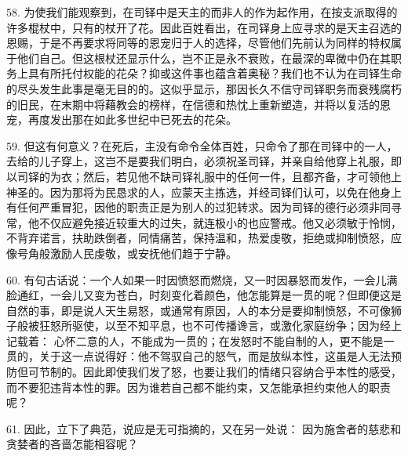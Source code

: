 58. 为使我们能观察到，在司铎中是天主的而非人的作为起作用，在按支派取得的许多棍杖中，只有的杖开了花。因此百姓看出，在司铎身上应寻求的是天主召选的恩赐，于是不再要求将同等的恩宠归于人的选择，尽管他们先前认为同样的特权属于他们自己。但这根杖还显示什么，岂不正是永不衰败，在最深的卑微中仍在其职务上具有所托付权能的花朵？抑或这件事也蕴含着奥秘？我们也不认为在司铎生命的尽头发生此事是毫无目的的。这似乎显示，那因长久不信守司铎职务而衰残腐朽的旧民，在末期中将藉教会的榜样，在信德和热忱上重新塑造，并将以复活的恩宠，再度发出那在如此多世纪中已死去的花朵。\par

59. 但这有何意义？在死后，主没有命令全体百姓，只命令了那在司铎中的一人，去给的儿子穿上，这岂不是要我们明白，必须祝圣司铎，并亲自给他穿上礼服，即以司铎的为衣；然后，若见他不缺司铎礼服中的任何一件，且都齐备，才可领他上神圣的。因为那将为民恳求的人，应蒙天主拣选，并经司铎们认可，以免在他身上有任何严重冒犯，因他的职责正是为别人的过犯转求。因为司铎的德行必须非同寻常，他不仅应避免接近较重大的过失，就连极小的也应警戒。他又必须敏于怜悯，不背弃诺言，扶助跌倒者，同情痛苦，保持温和，热爱虔敬，拒绝或抑制愤怒，应像号角般激励人民虔敬，或安抚他们趋于宁静。\par

60. 有句古话说：一个人如果一时因愤怒而燃烧，又一时因暴怒而发作，一会儿满脸通红，一会儿又变为苍白，时刻变化着颜色，他怎能算是一贯的呢？但即便这是自然的事，即是说人天生易怒，或通常有原因，人的本分是要抑制愤怒，不可像狮子般被狂怒所驱使，以至不知平息，也不可传播谗言，或激化家庭纷争；因为经上记载着： 心怀二意的人，不能成为一贯的；在发怒时不能自制的人，更不能是一贯的，关于这一点说得好：他不驾驭自己的怒气，而是放纵本性，这虽是人无法预防但可节制的。因此即使我们发了怒，也要让我们的情绪只容纳合乎本性的感受，而不要犯违背本性的罪。因为谁若自己都不能约束，又怎能承担约束他人的职责呢？\par

61. 因此，立下了典范，说应是无可指摘的，又在另一处说： 因为施舍者的慈悲和贪婪者的吝啬怎能相容呢？\par

